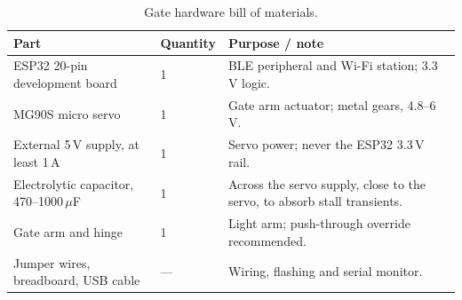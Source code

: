\begin{table}[htbp]
  \centering
  \small
  \begin{tabularx}{\textwidth}{@{}llX@{}}
    \toprule
    \textbf{Part} & \textbf{Quantity} & \textbf{Purpose / note} \\
    \midrule
    ESP32 20-pin development board & 1 & BLE peripheral and Wi-Fi station; 3.3\,V
      logic. \\
    MG90S micro servo & 1 & Gate arm actuator; metal gears, 4.8--6\,V. \\
    External 5\,V supply, at least 1\,A & 1 & Servo power; never the ESP32 3.3\,V
      rail. \\
    Electrolytic capacitor, 470--1000\,\(\mu\)F & 1 & Across the servo supply, close
      to the servo, to absorb stall transients. \\
    Gate arm and hinge & 1 & Light arm; push-through override recommended. \\
    Jumper wires, breadboard, USB cable & --- & Wiring, flashing and serial
      monitor. \\
    \bottomrule
  \end{tabularx}
  \caption{Gate hardware bill of materials.}
  \label{tab:bom}
\end{table}
